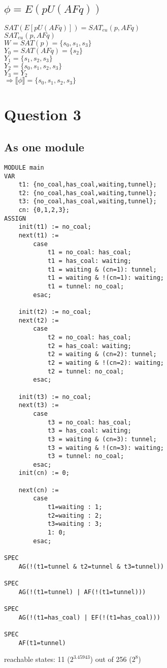 \documentclass[a4paper]{article}
\begin{document}
\subsection*{$\phi = E(pU(AFq))$}
\hspace*{5mm}$SAT(E[pU(AFq)]) = SAT_{eu}(p,AFq)$ 
\\[0.25cm] 
\hspace*{5mm}$SAT_{eu}(p,AFq)$ 
\\[0.25cm] 
\hspace*{10mm}$W = SAT(p) = \{s_0,s_1,s_3\}$
\\[0.25cm] 
\hspace*{10mm}$Y_0 = SAT(AFq) = \{s_2\}$
\\[0.25cm] 
\hspace*{10mm}$Y_1 = \{s_1,s_2,s_3\}$
\\[0.25cm] 
\hspace*{10mm}$Y_2 = \{s_0,s_1,s_2,s_3\}$
\\[0.25cm] 
\hspace*{10mm}$Y_3 = Y_2$
\\[0.25cm] 
\hspace*{5mm} $\Rightarrow \llbracket \phi \rrbracket = \{s_0,s_1,s_2,s_3\}$




\newpage
\section*{Question 3}
\subsection*{As one module}
\begin{verbatim}
MODULE main
VAR
	t1: {no_coal,has_coal,waiting,tunnel};
	t2: {no_coal,has_coal,waiting,tunnel};
	t3: {no_coal,has_coal,waiting,tunnel};
	cn: {0,1,2,3};
ASSIGN
	init(t1) := no_coal;
	next(t1) := 
		case
			t1 = no_coal: has_coal;
			t1 = has_coal: waiting;
			t1 = waiting & (cn=1): tunnel;
			t1 = waiting & !(cn=1): waiting;
			t1 = tunnel: no_coal;
		esac;

	init(t2) := no_coal;
	next(t2) := 
		case
			t2 = no_coal: has_coal;
			t2 = has_coal: waiting;
			t2 = waiting & (cn=2): tunnel;
			t2 = waiting & !(cn=2): waiting;
			t2 = tunnel: no_coal;
		esac;

	init(t3) := no_coal;
	next(t3) := 
		case
			t3 = no_coal: has_coal;
			t3 = has_coal: waiting;
			t3 = waiting & (cn=3): tunnel;
			t3 = waiting & !(cn=3): waiting;
			t3 = tunnel: no_coal;
		esac;
	init(cn) := 0;

	next(cn) := 
		case
			t1=waiting : 1;
			t2=waiting : 2;
			t3=waiting : 3;
			1: 0;
		esac;

SPEC
	AG(!(t1=tunnel & t2=tunnel & t3=tunnel))

SPEC
	AG(!(t1=tunnel) | AF(!(t1=tunnel)))

SPEC
	AG(!(t1=has_coal) | EF(!(t1=has_coal)))

SPEC
	AF(t1=tunnel)

\end{verbatim}
reachable states: 11 ($2^{3.45943}$) out of 256 ($2^8$)
\end{document}
